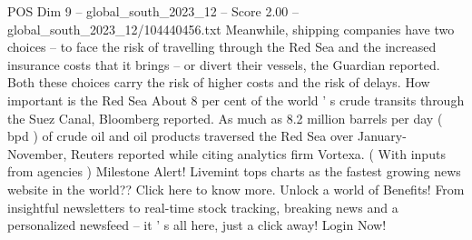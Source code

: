 \begin{textsample}{POS Dim 9 – global\_south\_2023\_12 – Score 2.00 – global\_south\_2023\_12/104440456.txt}
Meanwhile, shipping companies have two choices -- to face the risk of travelling through the Red Sea and the increased insurance costs that it brings -- or divert their vessels, the Guardian reported.
Both these choices carry the risk of higher costs and the risk of delays.
How important is the Red Sea About 8 per cent of the world ' s crude transits through the Suez Canal, Bloomberg reported.
As much as 8.2 million barrels per day ( bpd ) of crude oil and oil products traversed the Red Sea over January-November, Reuters reported while citing analytics firm Vortexa. ( With inputs from agencies ) Milestone Alert!
Livemint tops charts as the fastest growing news website in the world??
Click here to know more.
Unlock a world of Benefits!
From insightful newsletters to real-time stock tracking, breaking news and a personalized newsfeed -- it ' s all here, just a click away!
Login Now!

\end{textsample}
